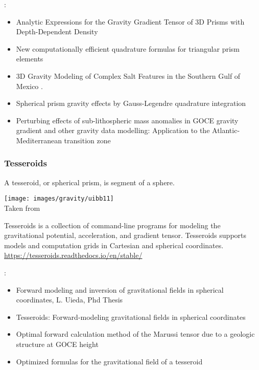 \Literature:
\begin{itemize}
\item Analytic Expressions for the Gravity Gradient Tensor 
      of 3D Prisms with Depth-Dependent Density \cite{jilz18}
\item New computationally efficient quadrature formulas for triangular prism elements \cite{kuym13}
\item 3D Gravity Modeling of Complex Salt Features in the Southern Gulf of Mexico \cite{naoo16}.
\item Spherical prism gravity effects by Gauss-Legendre quadrature integration \cite{asvk07}
\item Perturbing effects of sub-lithospheric mass anomalies in GOCE gravity gradient and other 
      gravity data modelling: Application to the Atlantic-Mediterranean transition zone \cite{furc15}
\end{itemize}




\subsubsection{Tesseroids}

A tesseroid, or spherical prism, is segment of a sphere. 


\begin{center}
\texttt{[image: images/gravity/uibb11]}\\
{\captionfont Taken from \cite{uibb11}}
\end{center}

Tesseroids is a collection of command-line programs for modeling the gravitational potential, 
acceleration, and gradient tensor. Tesseroids supports models and computation grids 
in Cartesian and spherical coordinates.
\url{https://tesseroids.readthedocs.io/en/stable/}

\Literature:
\begin{itemize}
\item Forward modeling and inversion of gravitational fields in spherical coordinates, L. Uieda, Phd Thesis 
\cite{uied16}
\item Tesseroids: Forward-modeling gravitational fields in spherical coordinates \cite{uibb15}
\item Optimal forward calculation method of the Marussi tensor due to a geologic structure at GOCE height 
\cite{uibb11}
\item Optimized formulas for the gravitational field of a tesseroid \cite{grsh13}
\end{itemize}



